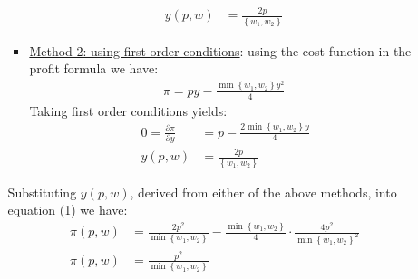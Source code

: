 \documentclass{article}
\begin{document}
\begin{itemize}
\begin{itemize}
\begin{itemize}
\begin{align*}
          y(p,w) &= \frac{2p}{\left\{ w_{1}, w_{2} \right\} } \ \tag{*}
        \end{align*}
        \item  \underline{Method 2: using first order conditions}: using the cost function in the profit formula we have:
        \begin{gather*}
          \pi = py - \frac{\min \left\{ w_{1}, w_{2} \right\} y^{2}}{4} \ \tag{1}
        \end{gather*}
        Taking first order conditions yields:
        \begin{align*}
          0 = \frac{\partial \pi}{\partial y} &= p - \frac{2 \min \left\{ w_{1}, w_{2} \right\} y}{4} \\
          y(p,w) &= \frac{2p}{\left\{ w_{1}, w_{2} \right\} } \ \tag{*}
        \end{align*}
      \end{itemize}
      Substituting $y(p,w)$, derived from either of the above methods, into equation (1) we have:
      \begin{align*}
        \pi(p,w) &= \frac{2p^{2}}{\min \left\{ w_{1}, w_{2} \right\} } - \frac{\min \left\{ w_{1}, w_{2} \right\} }{4} \cdot \frac{4p^{2}}{ \min \left\{ w_{1}, w_{2} \right\}^{2}} \\
        \pi(p,w) &= \frac{p^{2}}{\min \left\{ w_{1}, w_{2} \right\} }
      \end{align*}
    \end{itemize}
  \end{itemize}
\end{document}
